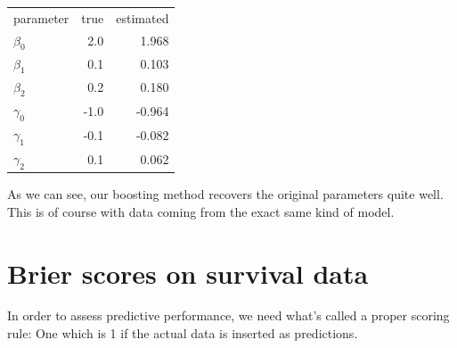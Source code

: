 \begin{tabular}{lrr}
    parameter  & true & estimated \\
    $\beta_0$  &  2.0 &     1.968 \\
    $\beta_1$  &  0.1 &     0.103 \\
    $\beta_2$  &  0.2 &     0.180 \\
    $\gamma_0$ & -1.0 &    -0.964 \\
    $\gamma_1$ & -0.1 &    -0.082 \\
    $\gamma_2$ &  0.1 &     0.062 \\
\end{tabular}

As we can see, our boosting method recovers the original parameters quite well. This is of course with data coming from the exact same kind of model.

\section{Brier scores on survival data}
In order to assess predictive performance, we need what's called a proper scoring rule: One which is 1 if the actual data is inserted as predictions.

